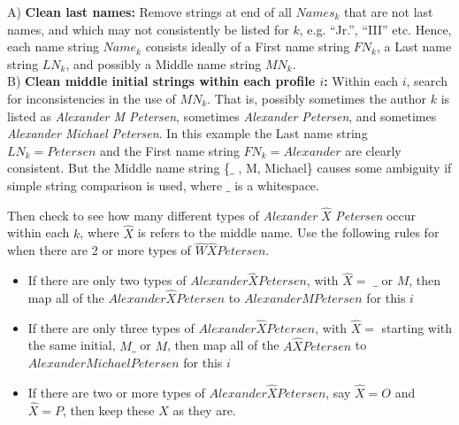 A) {\bf Clean last names:} 
Remove strings at end of all $Names_{k}$ that are not last names, and which may not consistently be listed for $k$, e.g. ``Jr.'', ``III'' etc. Hence, each name string  $Name_{k}$ consists ideally of a First name string $FN_{k}$, a Last name string $LN_{k}$, and possibly a Middle name string $MN_{k}$. \\

B)  {\bf Clean middle initial strings within each profile $i$:}  Within each $i$, search for inconsistencies in the use of $MN_{k}$. That is, possibly sometimes the author $k$ is listed as {\it Alexander M Petersen}, sometimes {\it Alexander Petersen}, and sometimes {\it Alexander Michael Petersen}. In this example the Last name string $LN_{k} = Petersen$ and the First name string $FN_{k} = Alexander$ are clearly consistent. But the Middle name string \{$\_$ , M, Michael\} causes some ambiguity if simple string comparison is used,  where $\_$ is a whitespace. 


Then check to see how many different types of {\it Alexander} $\hat X$ {\it Petersen} occur within each $k$, where $\hat X$ is refers to the middle name. Use the following rules for when there are 2 or more types of $\hat W \hat X Petersen$.
 
 \begin{itemize}
 \item If there are only two  types of $Alexander \hat X Petersen$, with $\hat X=$ $\_$ or $M$, then map all of the $Alexander \hat X Petersen$ to $Alexander M Petersen$ for this $i$
 \item If there are only three types of $Alexander \hat X Petersen$, with $\hat X=$ starting with the same initial, $M\_$ or $M$, then map all of the $A\hat X Petersen$ to $Alexander Michael Petersen$ for this $i$
 \item If there are two or more types of $Alexander \hat X Petersen$, say $\hat X=O$ and $\hat X=P$, then keep these $X$ as they are.
 
  
\end{itemize}

